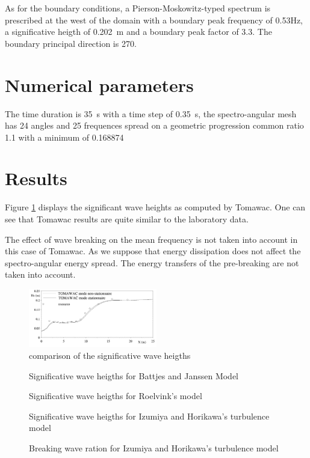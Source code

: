As for the boundary conditions, a Pierson-Moskowitz-typed spectrum is
prescribed at the west of the domain with a boundary peak frequency of 0.53Hz, a
significative heigth of 0.202~m and a boundary peak factor of 3.3. The boundary
principal direction is 270.
%
%
\section{Numerical parameters}
%
The time duration is 35~s with a time step of 0.35~s, the spectro-angular mesh
has 24 angles and 25 frequences spread on a geometric progression common ratio
1.1 with a minimum of 0.168874
%
%
\section{Results}
%
Figure \ref{resultbj1} displays the significant wave heights as computed by
Tomawac. One can see that Tomawac results are quite similar to the laboratory
data.

The effect of wave breaking on the mean frequency is not taken into account in
this case of Tomawac. As we suppose that energy dissipation does not affect the
spectro-angular energy spread. The energy transfers of the pre-breaking are
not taken into account.
\begin{figure} [!h]
\centering
\includegraphics[width=0.5\textwidth]{results.png}
 \caption{comparison of the significative wave heigths}
\label{resultbj1}
\end{figure}
\begin{figure} [!h]
\centering
{}
 \caption{Significative wave heigths for Battjes and Janssen Model}
\label{resultbj2}
\end{figure}
\begin{figure} [!h]
\centering
{}
 \caption{Significative wave heigths for Roelvink’s model}
\label{resultro3}
\end{figure}
\begin{figure} [!h]
\centering
{}
 \caption{Significative wave heigths for Izumiya and Horikawa’s turbulence model}
\label{resultih4}
\end{figure}
\begin{figure} [!h]
\centering
{}
 \caption{Breaking wave ration for Izumiya and Horikawa’s turbulence model}
\label{resultih4}
\end{figure}
